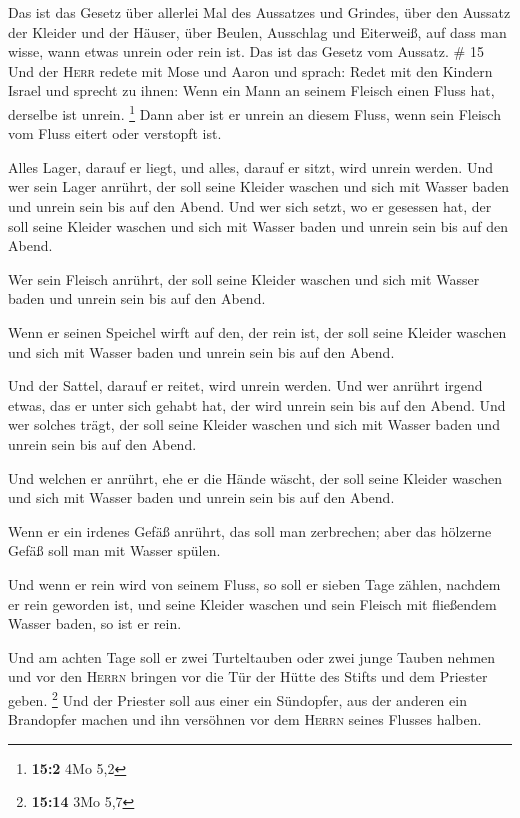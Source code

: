  Das ist das Gesetz über allerlei Mal des Aussatzes und
Grindes,  über den Aussatz der Kleider und der Häuser,
 über Beulen, Ausschlag und Eiterweiß, 
auf dass man wisse, wann etwas unrein oder rein ist. Das ist das Gesetz
vom Aussatz. \# 15  Und der \textsc{Herr} redete mit Mose
und Aaron und sprach:  Redet mit den Kindern Israel und
sprecht zu ihnen: Wenn ein Mann an seinem Fleisch einen Fluss hat,
derselbe ist unrein. \footnote{\textbf{15:2} 4Mo 5,2} 
Dann aber ist er unrein an diesem Fluss, wenn sein Fleisch vom Fluss
eitert oder verstopft ist.

 Alles Lager, darauf er liegt, und alles, darauf er sitzt,
wird unrein werden.  Und wer sein Lager anrührt, der soll
seine Kleider waschen und sich mit Wasser baden und unrein sein bis auf
den Abend.  Und wer sich setzt, wo er gesessen hat, der
soll seine Kleider waschen und sich mit Wasser baden und unrein sein bis
auf den Abend.

 Wer sein Fleisch anrührt, der soll seine Kleider waschen
und sich mit Wasser baden und unrein sein bis auf den Abend.

 Wenn er seinen Speichel wirft auf den, der rein ist, der
soll seine Kleider waschen und sich mit Wasser baden und unrein sein bis
auf den Abend.

 Und der Sattel, darauf er reitet, wird unrein werden.
 Und wer anrührt irgend etwas, das er unter sich gehabt
hat, der wird unrein sein bis auf den Abend. Und wer solches trägt, der
soll seine Kleider waschen und sich mit Wasser baden und unrein sein bis
auf den Abend.

 Und welchen er anrührt, ehe er die Hände wäscht, der
soll seine Kleider waschen und sich mit Wasser baden und unrein sein bis
auf den Abend.

 Wenn er ein irdenes Gefäß anrührt, das soll man
zerbrechen; aber das hölzerne Gefäß soll man mit Wasser spülen.

 Und wenn er rein wird von seinem Fluss, so soll er
sieben Tage zählen, nachdem er rein geworden ist, und seine Kleider
waschen und sein Fleisch mit fließendem Wasser baden, so ist er rein.

 Und am achten Tage soll er zwei Turteltauben oder zwei
junge Tauben nehmen und vor den \textsc{Herrn} bringen vor die Tür der
Hütte des Stifts und dem Priester geben. \footnote{\textbf{15:14} 3Mo
  5,7}  Und der Priester soll aus einer ein Sündopfer,
aus der anderen ein Brandopfer machen und ihn versöhnen vor dem
\textsc{Herrn} seines Flusses halben.

